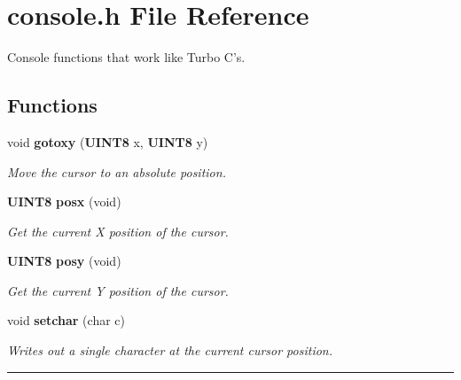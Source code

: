 \section{console.h File Reference}
\label{console.h}
Console functions that work like Turbo C's. 


\subsection*{Functions}
\begin{CompactItemize}
\item 
\label{console.h_a0}
void {\bf gotoxy} ({\bf UINT8} x, {\bf UINT8} y)
\begin{CompactList}\small\item\em Move the cursor to an absolute position.\item\end{CompactList}

\item 
\label{console.h_a1}
{\bf UINT8} {\bf posx} (void)
\begin{CompactList}\small\item\em Get the current X position of the cursor.\item\end{CompactList}

\item 
\label{console.h_a2}
{\bf UINT8} {\bf posy} (void)
\begin{CompactList}\small\item\em Get the current Y position of the cursor.\item\end{CompactList}

\item 
void {\bf setchar} (char c)
\begin{CompactList}\small\item\em Writes out a single character at the current cursor position.\item\end{CompactList}

\end{CompactItemize}
\vspace{0.4cm}\hrule\vspace{0.2cm}
